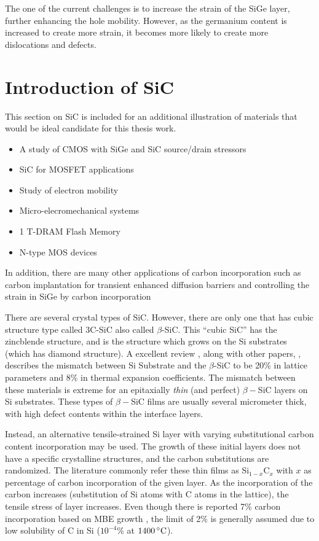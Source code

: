 The one of the current challenges is to increase the strain of the SiGe layer, further enhancing the hole mobility.  However, as the germanium content is increased to create more strain, it becomes more likely to create more dislocations and defects.

 

\section{Introduction of SiC}

	 This section on SiC is included for an additional illustration of materials that would be ideal candidate for this thesis work. 

{\SingleSpacing
\begin{itemize}
\item A  study of CMOS with SiGe and SiC source/drain stressors \cite{Ang1}
\item SiC for MOSFET applications \cite{Itokawa1,Calmes1,Chang1}
\item Study of electron mobility \cite{Chang1}
\item Micro-elecromechanical systems \cite{Forster1}
\item 1 T-DRAM Flash Memory \cite{Han1}
\item N-type MOS devices \cite{Hartmann2, Hartmann1}
\end{itemize}
}

 In addition, there are many other applications of carbon incorporation such as carbon implantation for transient enhanced diffusion barriers \cite{Guedj1} and controlling the strain in SiGe by carbon incorporation \cite{Kramer1,Eberl1,Pantelides1}

There are several crystal types of SiC.  However, there are only one that has cubic structure type called 3C-SiC also called $\beta$-SiC.  This ``cubic SiC'' has the zincblende structure, and is the structure which grows on the Si substrates (which has diamond structure).    A excellent review \cite{Davis1}, along with other papers, \cite{Liu2,Golecki1}, describes the mismatch between Si Substrate and the $\beta$-SiC to be 20\% in lattice parameters and 8\% in thermal expansion coefficients. The mismatch between these materials is extreme for an epitaxially  \emph{thin} (and perfect) $\beta-$SiC layers on Si substrates.  These types of $\beta-$SiC films are usually several micrometer thick, with high defect contents within the interface layers.  

Instead, an alternative tensile-strained Si layer with varying substitutional carbon content incorporation may be used.  The growth of these initial layers does not have a specific crystalline structures, and the carbon substitutions are randomized.  The literature commonly refer these thin films as Si$_{1-x}$C$_x$ with $x$ as percentage of carbon incorporation of the given layer.  As the incorporation of the carbon increases (substitution of Si atoms with C atoms in the lattice), the tensile stress of layer increases.  Even though there is reported 7\% carbon incorporation based on MBE growth \cite{Eberl1}, the limit of 2\% is generally assumed due to low solubility of C in Si ($10^{-4}\%$ at $1400 \,^{\circ}\mathrm{C}$)\cite{Hartmann1}.

